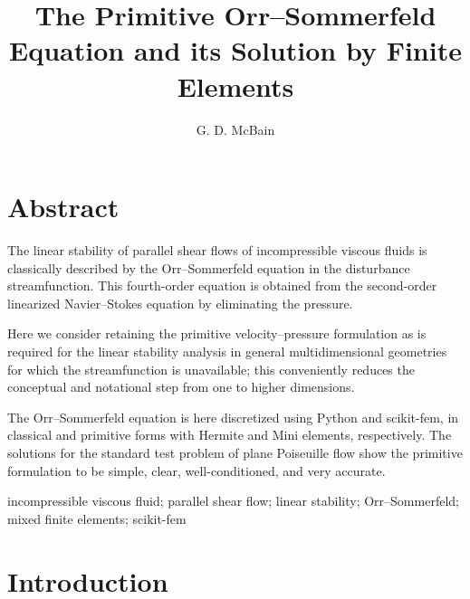 \documentclass[twocolum]{afmc_art}
\begin{document}
%
%
\title{The Primitive Orr--Sommerfeld Equation and its Solution by Finite Elements}

\author{G. D. McBain}
\maketitle

\section{Abstract}
The linear stability of parallel shear flows of incompressible viscous fluids is classically described by the Orr--Sommerfeld equation in the disturbance streamfunction.  This fourth-order equation is obtained from the second-order linearized Navier--Stokes equation by eliminating the pressure.

Here we consider retaining the primitive velocity--pressure formulation as is required for the linear stability analysis in general multidimensional geometries for which the streamfunction is unavailable; this conveniently reduces the conceptual and notational step from one to higher dimensions.


The Orr--Sommerfeld equation is here discretized using Python and scikit-fem, in classical and primitive forms with Hermite and Mini elements, respectively.  The solutions for the standard test problem of plane Poiseuille flow show the primitive formulation to be simple, clear, well-conditioned, and very accurate.


\keywords
incompressible viscous fluid;
parallel shear flow;
linear stability;
Orr--Sommerfeld;
mixed finite elements;
scikit-fem


\section{Introduction}
\end{document}
